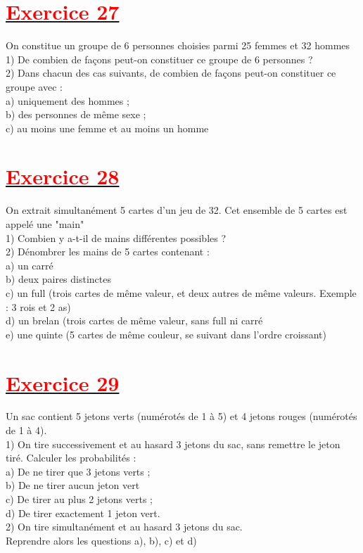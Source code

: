 \documentclass[12pt]{article}
\begin{document}
\section*{\underline{\textbf{\textcolor{red}{Exercice 27}}}}
On constitue un groupe de 6 personnes choisies parmi 25 femmes et 32 hommes\\
1) De combien de façons peut-on constituer ce groupe de 6 personnes ?\\
2) Dans chacun des cas suivants, de combien de façons peut-on constituer ce groupe avec :\\
a) uniquement des hommes ;\\
b) des personnes de même sexe ;\\
c) au moins une femme et au moins un homme\\
\section*{\underline{\textbf{\textcolor{red}{Exercice 28}}}}
On extrait simultanément 5 cartes d'un jeu de 32. Cet ensemble de 5 cartes est appelé une "main"\\
1) Combien y a-t-il de mains différentes possibles ?\\
2) Dénombrer les mains de 5 cartes contenant :\\
a) un carré\\
b) deux paires distinctes\\
c) un full (trois cartes de même valeur, et deux autres de même valeurs. Exemple : 3 rois et 2 as)\\
d) un brelan (trois cartes de même valeur, sans full ni carré\\
e) une quinte (5 cartes de même couleur, se suivant dans l'ordre croissant)\\
\section*{\underline{\textbf{\textcolor{red}{Exercice 29}}}}
Un sac contient 5 jetons verts (numérotés de 1 à 5) et 4 jetons rouges (numérotés de 1 à 4).\\
1) On tire successivement et au hasard 3 jetons du sac, sans remettre le jeton tiré. Calculer les probabilités :\\
a) De ne tirer que 3 jetons verts ;\\
b) De ne tirer aucun jeton vert\\
c) De tirer au plus 2 jetons verts ;\\
d) De tirer exactement 1 jeton vert.\\
2) On tire simultanément et au hasard 3 jetons du sac.\\
Reprendre alors les questions a), b), c) et d)
\end{document}
